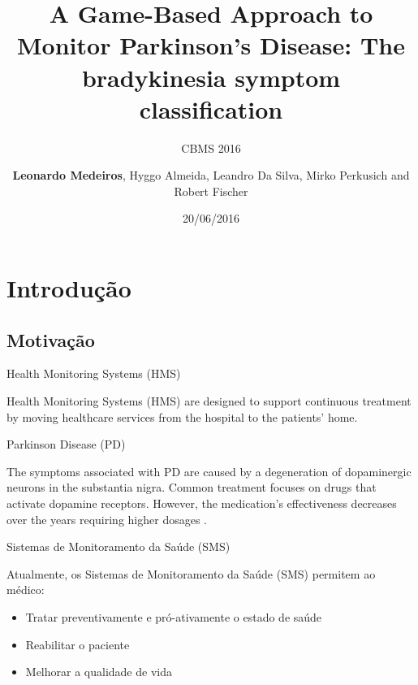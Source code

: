 \documentclass{beamer}
\author[]{\textbf{Leonardo Medeiros}, Hyggo Almeida, Leandro Da Silva, Mirko Perkusich and Robert Fischer}
\date{20/06/2016}
\institute[]{Federal University Of Campina Grande}
\title{A Game-Based Approach to Monitor Parkinson's Disease: The bradykinesia symptom classification}
\subtitle{CBMS 2016}
\begin{document}
\begin{frame}
  \titlepage
\end{frame}

{
}





\section{Introdução}
\subsection{Motivação}







\begin{frame}{Health Monitoring Systems (HMS)}  
  \begin{block}{}
Health Monitoring Systems (HMS) are designed to support continuous treatment by moving healthcare services from the hospital to the patients' home. 
  \end{block} 
\end{frame}

\begin{frame}{Parkinson Disease (PD)}  
  \begin{block}{}
The symptoms associated with PD are caused by a degeneration of dopaminergic neurons in the substantia nigra. Common treatment focuses on drugs that activate dopamine receptors. However, the medication's effectiveness decreases over the years requiring higher dosages \cite{national2006parkinson}.
  \end{block} 
\end{frame}
\begin{frame}{Sistemas de Monitoramento da Saúde (SMS)}  
  \begin{block}{}
  Atualmente, os Sistemas de Monitoramento da Saúde (SMS) permitem ao médico:
  \begin{itemize}
   \item Tratar preventivamente e pró-ativamente o estado de saúde~\cite{healthmonitoring2013}
   \item Reabilitar o paciente~\cite{sacbespoke2014}
   \item Melhorar a qualidade de vida~\cite{sacsvmhms2014}
  \end{itemize} 
  \end{block} 
\end{frame}
\end{document}
